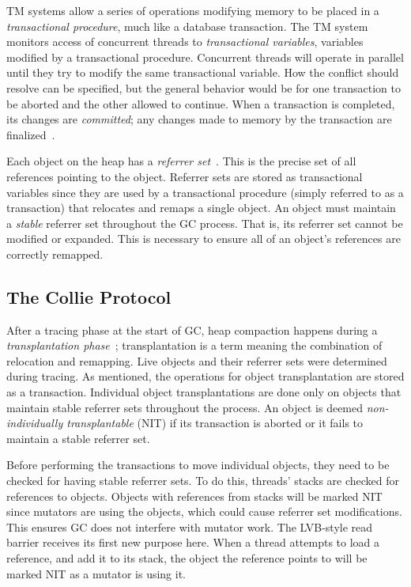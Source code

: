 \documentclass{sig-alternate}
\begin{document}
TM systems allow a series
of operations modifying memory to be placed in
a \emph{transactional procedure}, much like a database transaction.
The TM system monitors access of concurrent threads to \emph{transactional variables},
variables modified by a transactional procedure.
Concurrent threads will operate in parallel until they try to modify
the same transactional variable. How 
the conflict should resolve can be specified, but the general behavior would be for one transaction
to be aborted and the other allowed to continue.
When a transaction is completed, its changes are \emph{committed}; any changes 
made to memory by the transaction are finalized~\cite{wiki:transactional-memory}.

Each object on the heap has a \emph{referrer set}~\cite{Iyengar:Collie}. This is the precise set 
of all references pointing to the object. 
Referrer sets are stored as transactional variables since they are used by a transactional procedure 
(simply referred to as a transaction)
that relocates and remaps a single object.
An object must maintain a \emph{stable} referrer set throughout the GC process. That is,
its referrer set cannot be modified or expanded. This is necessary to ensure all of an object's references
are correctly remapped.


\subsection{The Collie Protocol}
\label{sec:collieProtocol}

After a tracing phase at the start of GC, heap compaction
happens during a \emph{transplantation phase}~\cite{Iyengar:Collie};
transplantation is a term meaning the combination of relocation and remapping.
Live objects and their referrer sets were determined during tracing. As mentioned, 
the operations for object transplantation are stored as a
transaction. Individual object transplantations are done only on objects 
that maintain stable referrer sets throughout the process.
An object is deemed \emph{non-individually transplantable} (NIT) if its transaction
is aborted or it fails to maintain a stable referrer set. 

Before performing the transactions to move individual objects, they
need to be checked for having stable referrer sets. To do this, threads' stacks
are checked for references to objects. Objects with references from stacks
will be marked NIT since mutators are using the objects, which could cause referrer set modifications.
This ensures GC does not interfere with mutator work.
The LVB-style read barrier receives its first new purpose here. When a thread attempts to load a reference,
and add it to its stack, the object the reference points to will be marked NIT as a mutator is using it.
\end{document}
